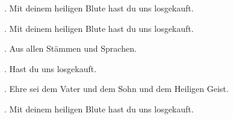 \Rbar. Mit deinem heiligen Blute \GreStar{} hast du uns losgekauft.

\Rbar. Mit deinem heiligen Blute \GreStar{} hast du uns losgekauft.

\Vbar. Aus allen Stämmen und Sprachen. 

\Rbar. Hast du uns losgekauft.

\Vbar. Ehre sei dem Vater und dem Sohn und dem Heiligen Geist.

\Rbar. Mit deinem heiligen Blute \GreStar{} hast du uns losgekauft.
